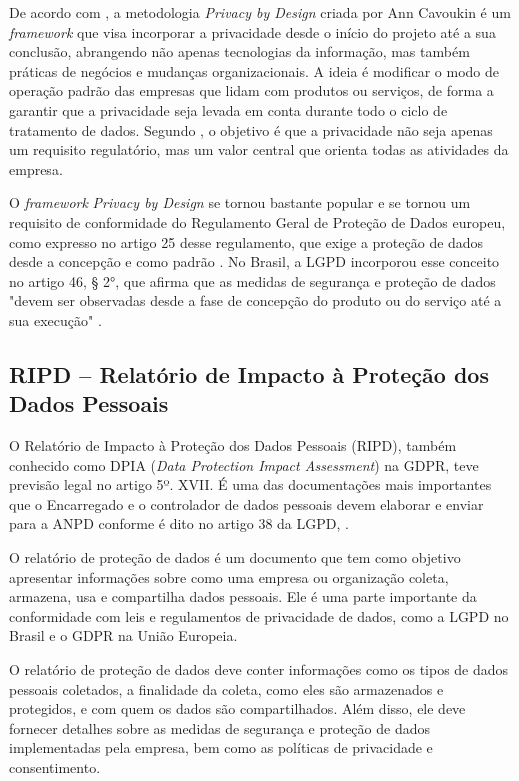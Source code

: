 \documentclass[
	12pt,				%
	openright,			%
	oneside,			%
	a4paper,			%
	english,			%
	french,				%
	spanish,			%
	brazil,				%
	]{abntex2}
\begin{document}
De acordo com , a metodologia \textit{Privacy by Design} criada por Ann Cavoukin é um \textit{framework} que visa incorporar a privacidade desde o início do projeto até a sua conclusão, abrangendo não apenas tecnologias da informação, mas também práticas de negócios e mudanças organizacionais. A ideia é modificar o modo de operação padrão das empresas que lidam com produtos ou serviços, de forma a garantir que a privacidade seja levada em conta durante todo o ciclo de tratamento de dados. Segundo , o objetivo é que a privacidade não seja apenas um requisito regulatório, mas um valor central que orienta todas as atividades da empresa.

O \textit{framework} \textit{Privacy by Design} se tornou bastante popular e se tornou um requisito de conformidade do Regulamento Geral de Proteção de Dados europeu, como expresso no artigo 25 desse regulamento, que exige a proteção de dados desde a concepção e como padrão \cite{oliveira2020}. No Brasil, a LGPD incorporou esse conceito no artigo 46, § 2°, que afirma que as medidas de segurança e proteção de dados "devem ser observadas desde a fase de concepção do produto ou do serviço até a sua execução" \cite{01-01-LeiGeral}.


\subsection{ RIPD – Relatório de Impacto à Proteção dos Dados Pessoais  }

O Relatório de Impacto à Proteção dos Dados Pessoais (RIPD), também conhecido como DPIA (\textit{Data Protection Impact Assessment}) na GDPR, teve previsão legal no artigo 5º. XVII. É uma das documentações mais importantes que o Encarregado e o controlador de dados pessoais devem elaborar e enviar para a ANPD conforme é dito no artigo 38 da LGPD, \cite{01-01-LeiGeral}.

O relatório de proteção de dados é um documento que tem como objetivo apresentar informações sobre como uma empresa ou organização coleta, armazena, usa e compartilha dados pessoais. Ele é uma parte importante da conformidade com leis e regulamentos de privacidade de dados, como a LGPD no Brasil e o GDPR na União Europeia.

O relatório de proteção de dados deve conter informações como os tipos de dados pessoais coletados, a finalidade da coleta, como eles são armazenados e protegidos, e com quem os dados são compartilhados. Além disso, ele deve fornecer detalhes sobre as medidas de segurança e proteção de dados implementadas pela empresa, bem como as políticas de privacidade e consentimento.
\end{document}
